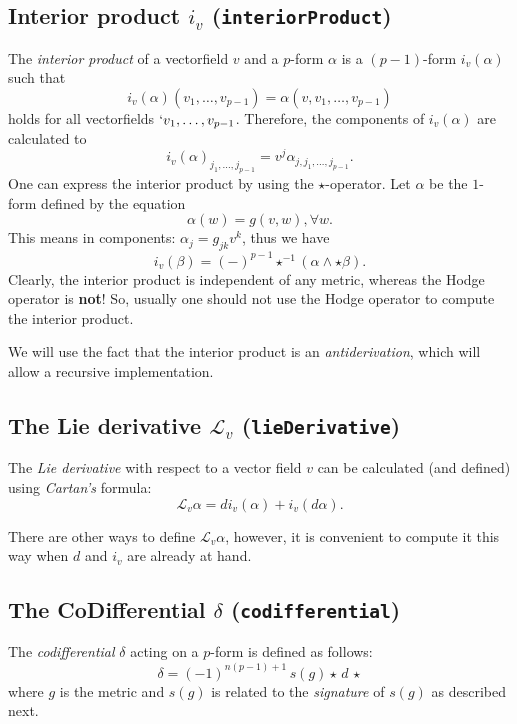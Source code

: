 \documentclass[12pt,a4paper]{article}
\begin{document}
\subsection{Interior product $i_v$ ({\tt interiorProduct})}
The {\it interior product} of a vectorfield $v$ and a $p$-form $\alpha$
is a $(p-1)$-form $i_v(\alpha)$ such that
\begin{displaymath}
	 i_v (\alpha) (v_1, \ldots, v_{p - 1}) = 
	   \alpha (v, v_1, \ldots, v_{p - 1})
\end{displaymath}
holds for all vectorfields $`v_1, \ldots, v_{p - 1}$. Therefore, the 
components of $i_v (\alpha)$ are calculated to
\begin{displaymath}
	 i_v (\alpha)_{j_1, \ldots, j_{p - 1}} = 
	 v^j \alpha_{j, j_1, \ldots, j_{p -1}}.
\end{displaymath}
One can express the interior product by using the $\star$-operator. 
Let $\alpha$ be the $1$-form defined by the equation 
\begin{displaymath}
	 \alpha (w) = g (v, w), \forall w. 
\end{displaymath}
This means in components: $\alpha_j = g_{j k} v^k$, 
thus we have
\begin{displaymath}
	i_v (\beta) = (-)^{p - 1} \star^{- 1} (\alpha \wedge \star \beta) .
\end{displaymath}
Clearly, the interior product is independent of any metric, whereas the 
Hodge operator is {\bf not}! So, usually one should not use the Hodge 
operator to compute the interior product.

We will use the fact that the interior product is an {\it antiderivation},
which will allow a recursive implementation.
%

\subsection{The Lie derivative $\mathcal{L}_v$ ({\tt lieDerivative})} 
The {\it Lie derivative} with respect to a vector field $v$ can be 
calculated (and defined) using {\it Cartan's} formula:
\begin{displaymath}
	\mathcal{L}_v \alpha = d i_v (\alpha) + i_v (d \alpha).
\end{displaymath}

There are other ways to define $\mathcal{L}_v \alpha$, however, 
it is convenient to compute it this way when $d$ and $i_v$ are 
already at hand.
%

\subsection{The CoDifferential $\delta$ ({\tt codifferential})}
The {\it codifferential} $\delta$ acting on a $p$-form is defined 
as follows:
\begin{displaymath}
	 \delta = (-1)^{n(p-1)+1}\,s(g) \star\,d\,\star
\end{displaymath}
where $g$ is the metric and $s(g)$ is related to the 
{\it signature} of $s(g)$ as described next.
%
\end{document}
